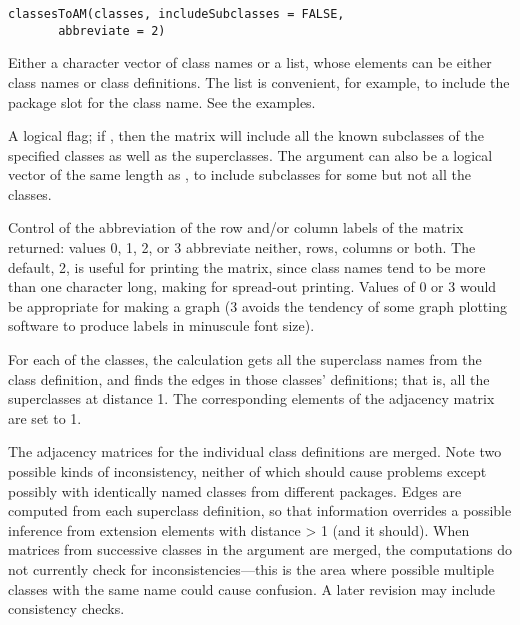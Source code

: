 %
\begin{Usage}
\begin{verbatim}
classesToAM(classes, includeSubclasses = FALSE,
       abbreviate = 2)
\end{verbatim}
\end{Usage}
%
\begin{Arguments}
\begin{ldescription}
\item[\code{classes}] 
Either a character vector of class names or a list, whose
elements can be either class names or class definitions.  The
list is convenient, for example, to include the package slot for
the class name. See the examples.

\item[\code{includeSubclasses}] 
A logical flag; if , then the matrix will include all
the known subclasses of the specified classes as well as the
superclasses.  The argument can also be a logical vector of the
same length as , to include subclasses for some
but not all the classes.

\item[\code{abbreviate}] 
Control of the abbreviation of the row and/or  column labels of
the matrix returned: values 0, 1, 2, or 3 abbreviate neither,
rows, columns or both.  The default, 2, is useful for printing
the matrix, since class names tend to be more than one
character long, making for spread-out printing.  Values of 0
or 3 would be appropriate for making a graph (3 avoids the
tendency of some graph plotting software to produce labels in
minuscule font size).

\end{ldescription}
\end{Arguments}
%
\begin{Details}\relax
For each of the classes, the calculation gets all the superclass
names from the class definition, and finds the edges in those classes'
definitions; that is, all the superclasses at distance 1.  The
corresponding elements of the adjacency matrix are set to 1.

The adjacency matrices for the individual class definitions are
merged.  Note two possible kinds of inconsistency, neither of which
should cause problems except possibly with identically named classes from
different packages.  Edges are computed from each superclass
definition, so that information overrides a possible inference from
extension elements with distance > 1 (and it should).  When
matrices from successive classes in the argument are merged, the
computations do not currently check for inconsistencies---this is
the area where possible multiple classes with the same name could
cause confusion.  A later revision may include consistency checks.
\end{Details}
